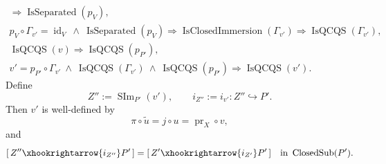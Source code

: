 \begin{lemma}
\[\begin{gathered}
      \Longrightarrow \operatorname{IsSeparated}(p_V),\\
    p_V\circ\Gamma_{v'}=\operatorname{id}_V
      \ \wedge\ \operatorname{IsSeparated}(p_V)
      \Longrightarrow
      \operatorname{IsClosedImmersion}(\Gamma_{v'})
      \Longrightarrow\operatorname{IsQCQS}(\Gamma_{v'}),\\
    \operatorname{IsQCQS}(v)
      \Longrightarrow\operatorname{IsQCQS}(p_{P'}),\\
    v'=p_{P'}\circ\Gamma_{v'}
      \ \wedge\ \operatorname{IsQCQS}(\Gamma_{v'})
      \ \wedge\ \operatorname{IsQCQS}(p_{P'})
      \Longrightarrow\operatorname{IsQCQS}(v').
  \end{gathered}                                                   \tag{SI1}
  \]
  Define
  \[
    Z'':=\operatorname{SIm}_{P'}(v'),\qquad
    i_{Z''}:=i_{v'}\colon Z''\hookrightarrow P'.                  \tag{SI2}
  \]
  Then $v'$ is well-defined by
  \[
    \pi\circ\widetilde u=j\circ u
      =\operatorname{pr}_X\circ v,
  \]
  and
  \[
    [\,Z''\xhookrightarrow{i_{Z''}}P'\,]
      =[\,Z'\xhookrightarrow{i_{Z'}}P'\,]
      \quad\text{in }\operatorname{ClosedSub}(P').
  \]
\end{lemma}

